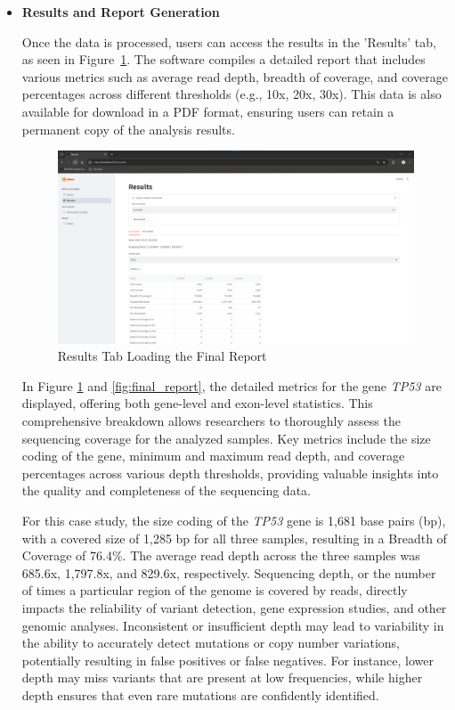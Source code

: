 \begin{itemize}
    \item \textbf{Results and Report Generation}

    Once the data is processed, users can access the results in the 'Results' tab, as seen in Figure~\ref{fig:results_loading}. The software compiles a detailed report that includes various metrics such as average read depth, breadth of coverage, and coverage percentages across different thresholds (e.g., 10x, 20x, 30x). This data is also available for download in a PDF format, ensuring users can retain a permanent copy of the analysis results.
    
    \begin{figure}[H]
        \centering
        \includegraphics[width=\textwidth]{figs/v3.3.png}
        \caption{Results Tab Loading the Final Report}
        \label{fig:results_loading}
    \end{figure}
    
    In Figure \ref{fig:results_loading} and \ref{fig:final_report}, the detailed metrics for the gene \textit{TP53} are displayed, offering both gene-level and exon-level statistics. This comprehensive breakdown allows researchers to thoroughly assess the sequencing coverage for the analyzed samples. Key metrics include the size coding of the gene, minimum and maximum read depth, and coverage percentages across various depth thresholds, providing valuable insights into the quality and completeness of the sequencing data.
    
    For this case study, the size coding of the \textit{TP53} gene is 1,681 base pairs (bp), with a covered size of 1,285 bp for all three samples, resulting in a Breadth of Coverage of 76.4\%. The average read depth across the three samples was 685.6x, 1,797.8x, and 829.6x, respectively. Sequencing depth, or the number of times a particular region of the genome is covered by reads, directly impacts the reliability of variant detection, gene expression studies, and other genomic analyses. Inconsistent or insufficient depth may lead to variability in the ability to accurately detect mutations or copy number variations, potentially resulting in false positives or false negatives. For instance, lower depth may miss variants that are present at low frequencies, while higher depth ensures that even rare mutations are confidently identified. \cite{Larson2023}
    

\end{itemize}
